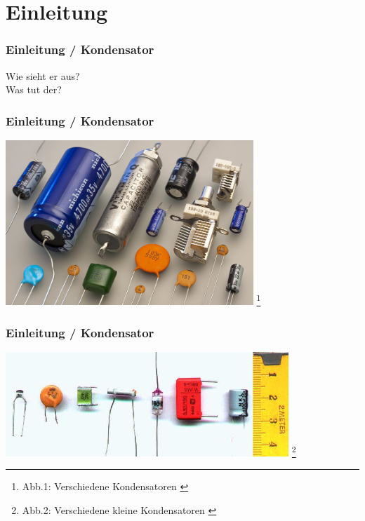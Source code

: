 

\subtitle{Technik Klasse E 05: \\
          Der Kondensator und seine Schaltungsarten \\[2em]}
\date{Stand 26.10.2015}


\section*{Einleitung}

\begin{frame}
    \frametitle{Einleitung / Kondensator}
    \begin{center}
        \Large{Wie sieht er aus?}\\
        \Large{Was tut der?}         
    \end{center}
\end{frame}


\begin{frame}
    \frametitle{Einleitung / Kondensator}

    \begin{center}
        \includegraphics[width=0.7\textwidth]{e05/Kondensator01.jpg}
        \footnote{Abb.1: Verschiedene Kondensatoren \cite{wmen}}
    \end{center}
 	

\end{frame}

\begin{frame}
    \frametitle{Einleitung / Kondensator}

    \begin{center}
        \includegraphics[width=0.8\textwidth]{e05/Kondensator02.jpg}
        \footnote{Abb.2: Verschiedene kleine Kondensatoren \cite{wmen}}
    \end{center}
\end{frame}

